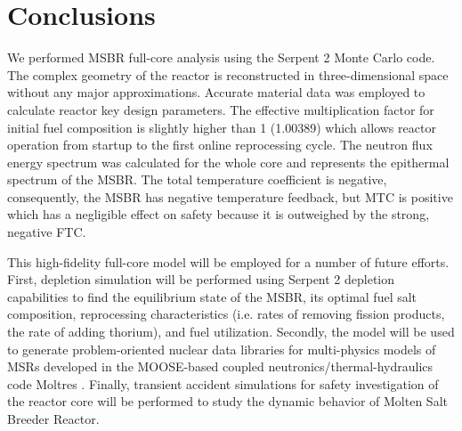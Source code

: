 \documentclass{anstrans}
\begin{document}
\section{Conclusions}
We performed \gls{MSBR} full-core analysis using the Serpent 2 Monte Carlo 
code. The complex geometry of the reactor is reconstructed in three-dimensional 
space without any major approximations. Accurate material data was employed to 
calculate reactor key design parameters. The effective multiplication factor 
for initial fuel composition is slightly higher than 1 (1.00389) which allows 
reactor operation from startup to the first online reprocessing cycle. The 
neutron flux energy spectrum was calculated for the whole core and represents 
the epithermal spectrum of the MSBR. The total temperature coefficient is 
negative, consequently, the MSBR has negative temperature feedback, but MTC is 
positive which has a negligible effect on safety because it is outweighed by 
the strong, negative FTC.

This high-fidelity full-core model will be employed for a number of future 
efforts. First, depletion simulation will be performed using Serpent 2 
depletion capabilities to find the equilibrium state of the MSBR, its optimal 
fuel salt composition, reprocessing characteristics (i.e. rates of removing 
fission products, the rate of adding thorium), and fuel utilization. Secondly, 
the model will be used to generate problem-oriented nuclear data libraries for 
multi-physics models of \glspl{MSR} developed in the MOOSE-based coupled 
neutronics/thermal-hydraulics code Moltres \cite{lindsay_arfc/moltres:_2017}.  
Finally, transient accident simulations for safety investigation of the reactor 
core will be performed to study the dynamic behavior of Molten Salt Breeder 
Reactor. 




\end{document}
